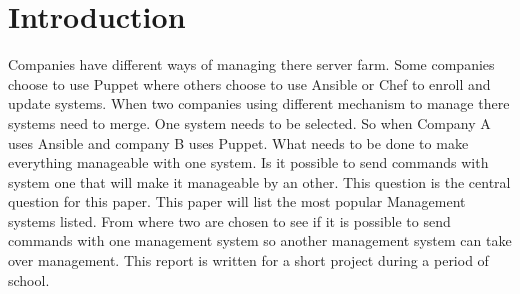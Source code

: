 \chapter{Introduction}\label{ch:introduction}

Companies have different ways of managing there server farm. Some companies choose to use Puppet\cite{whatispuppet} where others choose to use Ansible\cite{whatisansible} or Chef \cite{whatischef} to enroll and update systems. When two companies using different mechanism to manage there systems need to merge. One system needs to be selected. So when Company A uses Ansible and company B uses Puppet. What needs to be done to make everything manageable with one system. Is it possible to send commands with system one that will make it manageable by an other. This question is the central question for this paper. This paper will list the most popular Management systems listed. From where two are chosen to see if it is possible to send commands with one management system so another management system can take over management. This report is written for a short project during a period of school. 
  
